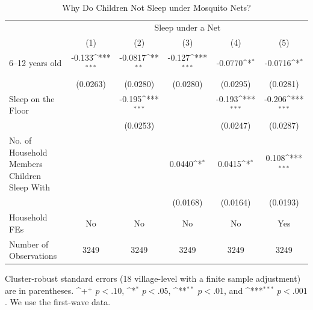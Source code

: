 \documentclass[fleqn,11pt]{article}
\newcommand{\sym}[1]{\rlap{$#1$}}
\def\sym#1{\ifmmode^{#1}\else\(^{#1}\)\fi
}
\begin{document}
\begin{table}[h]
\caption{Why Do Children Not Sleep under Mosquito Nets?}
\label{floornetusing}
\centering
\begin{adjustbox}{max width=\textwidth}
\begin{threeparttable}
\begin{tabular}{l*{5}{c}}
\hline\hline
	&\multicolumn{5}{c}{Sleep under a Net}\\  \cmidrule(lr){2-6}

                    &\multicolumn{1}{c}{(1)}&\multicolumn{1}{c}{(2)}&\multicolumn{1}{c}{(3)}&\multicolumn{1}{c}{(4)}&\multicolumn{1}{c}{(5)}\\

\hline
6--12 years old      &      -0.133\sym{***}&     -0.0817\sym{**} &      -0.127\sym{***}&     -0.0770\sym{*}  &     -0.0716\sym{*}  \\
                    &    (0.0263)         &    (0.0280)         &    (0.0280)         &    (0.0295)         &    (0.0281)         \\

Sleep on the Floor               &                     &      -0.195\sym{***}&                     &      -0.193\sym{***}&      -0.206\sym{***}\\
                    &                     &    (0.0253)         &                     &    (0.0247)         &    (0.0287)         \\

No. of Household Members Children Sleep With          &                     &                     &      0.0440\sym{*}  &      0.0415\sym{*}  &       0.108\sym{***}\\
                    &                     &                     &    (0.0168)         &    (0.0164)         &    (0.0193)         \\
                    
Household FEs         &   No                   &   No                   &   No      &   No     &  Yes   \\

\hline
Number of Observations        &        3249         &        3249         &        3249         &        3249         &        3249         \\
\hline\hline
\end{tabular}
\begin{tablenotes}
\item Cluster-robust standard errors (18 village-level with a finite sample adjustment) are in parentheses. \sym{+} \(p<.10\), \sym{*} \(p<.05\), \sym{**} \(p<.01\), and \sym{***} \(p<.001\). We use the first-wave data.
\end{tablenotes}
\end{threeparttable}
\end{adjustbox}
\end{table}
\end{document}
